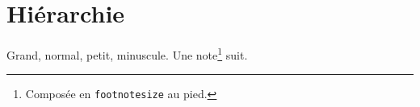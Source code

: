 \documentclass{article}
\begin{document}
\hsize=380pt
\section{Hi\'erarchie}
{\Large Grand}, normal, {\small petit}, {\tiny minuscule}. Une note\footnote{Compos\'ee en \texttt{footnotesize} au pied.} suit.
\end{document}
